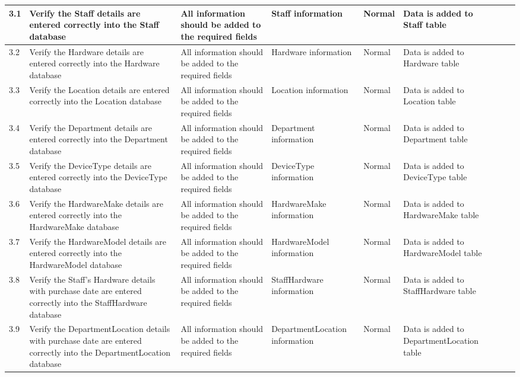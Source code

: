 \begin{landscape}
\begin{center}
\begin{longtable}{|p{1.5cm}|p{2.5cm}|p{2.5cm}|p{4cm}|p{2cm}|p{2cm}|p{1cm}|p{1cm}|}
3.1 & Verify the Staff details are entered correctly into the Staff database & All information should be added to the required fields  & Staff information & Normal& Data is added to Staff table && \\ \hline
3.2 & Verify the Hardware details are entered correctly into the Hardware database & All information should be added to the required fields  &Hardware information & Normal& Data is added to Hardware table && \\ \hline
3.3 & Verify the Location details are entered correctly into the Location database & All information should be added to the required fields  &Location information & Normal& Data is added to Location table && \\ \hline
3.4 & Verify the Department details are entered correctly into the Department database & All information should be added to the required fields  &Department information & Normal& Data is added to Department table && \\ \hline
3.5 & Verify the DeviceType details are entered correctly into the DeviceType database & All information should be added to the required fields  &DeviceType information & Normal& Data is added to DeviceType table && \\ \hline
3.6 & Verify the HardwareMake details are entered correctly into the HardwareMake database & All information should be added to the required fields  &HardwareMake information & Normal& Data is added to HardwareMake table && \\ \hline
3.7 & Verify the HardwareModel details are entered correctly into the HardwareModel database & All information should be added to the required fields  &HardwareModel information & Normal& Data is added to HardwareModel table && \\ \hline
3.8 & Verify the Staff's Hardware details with purchase date are entered correctly into the StaffHardware database & All information should be added to the required fields  &StaffHardware information & Normal& Data is added to StaffHardware table && \\ \hline
3.9 & Verify the DepartmentLocation details with purchase date are entered correctly into the DepartmentLocation database & All information should be added to the required fields  &DepartmentLocation information & Normal& Data is added to DepartmentLocation table && \\ \hline



\end{longtable}
\end{center}
\end{landscape}
